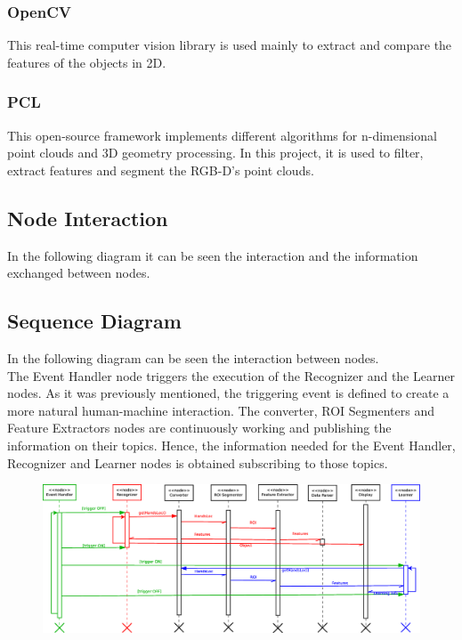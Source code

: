 \subsubsection{ OpenCV}
This real-time computer vision library is used mainly to extract and compare the features of the objects in 2D. 
\subsubsection{PCL}
This open-source framework implements different algorithms for n-dimensional point clouds and 3D geometry processing.
In this project, it is used to filter, extract features and segment the RGB-D's point clouds.

\subsection{Node Interaction}
In the following diagram it can be seen the interaction and the information exchanged between nodes.

\subsection{Sequence Diagram}
In the following diagram can be seen the interaction between nodes. \\
The Event Handler node triggers the execution of the Recognizer and the Learner nodes. As it was previously mentioned, the triggering event is defined to create a more natural human-machine interaction.
The converter, ROI Segmenters and Feature Extractors nodes are continuously working and publishing the information on their topics. 
Hence, the information needed for the Event Handler, Recognizer and Learner nodes is obtained subscribing to those topics. 
\begin{figure}[H]
\begin{center}
\includegraphics[width=\textwidth]{img/diagrams/sequence.eps}
\end{center}
\end{figure}

